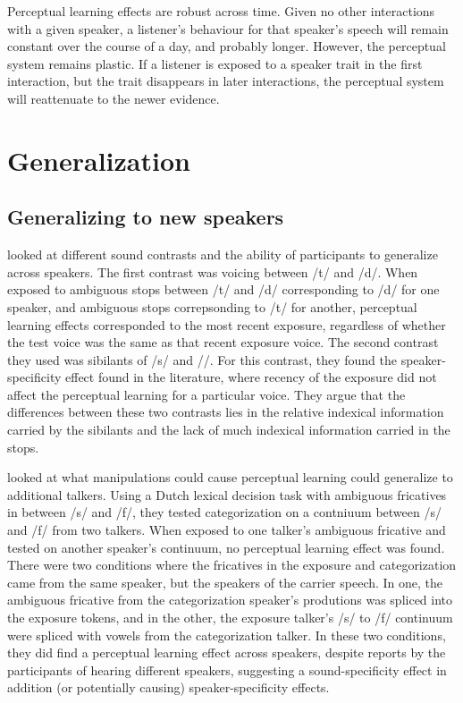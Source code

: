 Perceptual learning effects are robust across time.  
Given no other interactions with a given speaker, a listener's behaviour for that speaker's speech will remain constant over the course of a day, and probably longer. 
However, the perceptual system remains plastic.  
If a listener is exposed to a speaker trait in the first interaction, but the trait disappears in later interactions, the perceptual system will reattenuate to the newer evidence.

\section{Generalization}

\subsection{Generalizing to new speakers}

\citet{Kraljic2007} looked at different sound contrasts and the ability of participants to generalize across speakers.  
The first contrast was voicing between /t/ and /d/.  
When exposed to ambiguous stops between /t/ and /d/ corresponding to /d/ for one speaker, and ambiguous stops correpsonding to /t/ for another, perceptual learning effects corresponded to the most recent exposure, regardless of whether the test voice was the same as that recent exposure voice.  
The second contrast they used was sibilants of /s/ and /\textesh/. 
 For this contrast, they found the speaker-specificity effect found in the literature, where recency of the exposure did not affect the perceptual learning for a particular voice.  They argue that the differences between these two contrasts lies in the relative indexical information carried by the sibilants and the lack of much indexical information carried in the stops.

\citet{Eisner2005} looked at what manipulations could cause perceptual learning could generalize to additional talkers.  
Using a Dutch lexical decision task with ambiguous fricatives in between /s/ and /f/, they tested categorization on a contniuum between /s/ and /f/ from two talkers.  
When exposed to one talker's ambiguous fricative and tested on another speaker's continuum, no perceptual learning effect was found.  
There were two conditions where the fricatives in the exposure and categorization came from the same speaker, but the speakers of the carrier speech.  
In one, the ambiguous fricative from the categorization speaker's produtions was spliced into the exposure tokens, and in the other, the exposure talker's /s/ to /f/ continuum were spliced with vowels from the categorization talker.
In these two conditions, they did find a perceptual learning effect across speakers, despite reports by the participants of hearing different speakers, suggesting a sound-specificity effect in addition (or potentially causing) speaker-specificity effects. 

